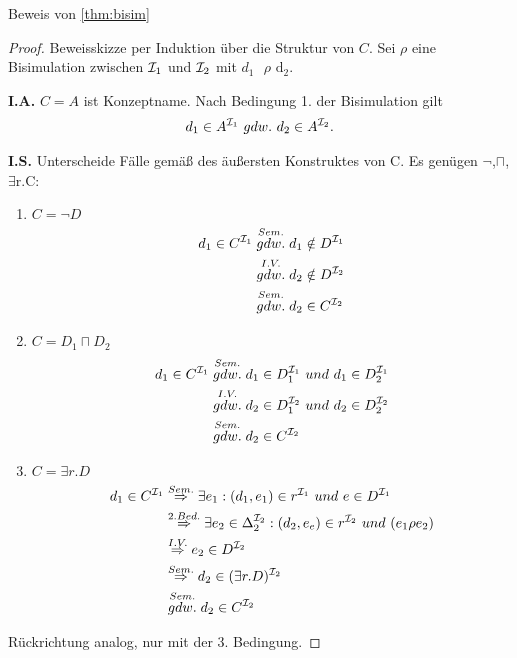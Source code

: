 \begin{tafel} Beweis von \autoref{thm:bisim}
\begin{proof}
Beweisskizze per Induktion über die Struktur von $C$. Sei $\rho$ eine
Bisimulation zwischen $\mathcal{I}_1$ und $\mathcal{I}_2$ mit
$d_1\text{\ $\rho$}\text{\ d}_2$.

\textbf{I.A.} $C = A$ ist Konzeptname. Nach Bedingung 1. der
Bisimulation gilt
\begin{align*}
    d_1 \in A^{\mathcal{I}_1}\ gdw.\ d_2 \in A^{\mathcal{I}_2}.
\end{align*}


\textbf{I.S.} Unterscheide Fälle gemäß des äußersten Konstruktes von C.
Es genügen $\neg$,$\sqcap$, $\exists\text{r.C}$:

\begin{enumerate}
\item
  $C = \neg D$
    \begin{align*}
        d_1 \in C^{\mathcal{I}_1} &\stackrel{Sem.}{gdw.} d_1 \notin D^{\mathcal{I}_1}\\
        &\stackrel{I.V.}{gdw.} d_2 \notin D^{\mathcal{I}_2} \\
        &\stackrel{Sem.}{gdw.} d_2 \in C^{\mathcal{I}_2}
    \end{align*}
\item $C = D_1 \sqcap D_2$
  \begin{align*}
d_1 \in C^{\MI_1} &\stackrel{Sem.}{gdw.} d_1 \in D_1^{\MI_1}\ und\ d_1 \in D_2^{\MI_1}\\
&\stackrel{I.V.}{gdw.} d_2 \in D_1^{\MI_2}\ und\ d_2 \in D_2^{\MI_2} \\
&\stackrel{Sem.}{gdw.} d_2 \in C^{\MI_2}
\end{align*}

\item $C = \exists r.D$
  \begin{align*}
d_1 \in C^{\mathcal{I}_1} &\stackrel{Sem.}{\Rightarrow} \exists e_1 : (d_1,e_1) \in r^{\mathcal{I}_1}\ und\ e \in D^{\mathcal{I}_1}\\
&\stackrel{2.Bed.}{\Rightarrow} \exists e_2 \in \Delta_2^{\mathcal{I}_2}: (d_2,e_e) \in r^{\mathcal{I}_2}\ und\ (e_1 \rho e_2) \\
&\stackrel{I.V.}{\Rightarrow} e_2 \in D^{\mathcal{I}_2} \\
&\stackrel{Sem.}{\Rightarrow} d_2 \in (\exists r.D)^{\mathcal{I}_2} \\
&\stackrel{Sem.}{gdw.} d_2 \in C^{\mathcal{I}_2}
\end{align*}
\end{enumerate}
Rückrichtung analog, nur mit der 3. Bedingung.
\end{proof}
\end{tafel}

